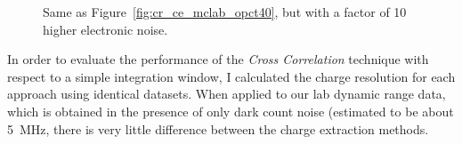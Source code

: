 \begin{figure}
  \caption[Charge resolution comparison between Cross Correlation and Window Integration for MC-lab data with a high amount of electronic noise.]{Same as Figure~\ref{fig:cr_ce_mclab_opct40}, but with a factor of 10 higher electronic noise.}
  \label{fig:cr_ce_mclab_opct20}
\end{figure}

In order to evaluate the performance of the \textit{Cross Correlation} technique with respect to a simple integration window, I calculated the charge resolution for each approach using identical datasets. When applied to our lab dynamic range data, which is obtained in the presence of only dark count noise (estimated to be about \SI{5}{MHz}, there is very little difference between the charge extraction methods.





